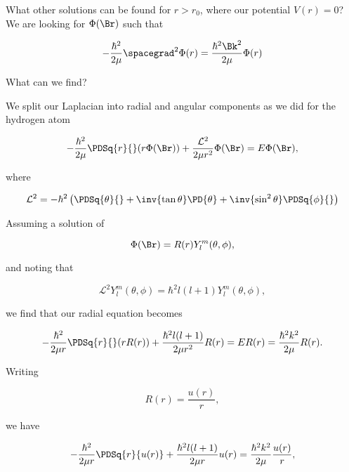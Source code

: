 What other solutions can be found for $r > r_0$, where our potential $V(r) = 0$?  We are looking for $\Phi(\Br)$ such that

\begin{equation}\label{eqn:qmTwoL23:60}
- \frac{\hbar^2}{2\mu} \spacegrad^2
\Phi(r)
 = \frac{\hbar^2 \Bk^2}{2 \mu}
\Phi(r)
\end{equation}

What can we find?

We split our Laplacian into radial and angular components as we did for the hydrogen atom

\begin{equation}\label{eqn:qmTwoL23:80}
- \frac{\hbar^2}{2\mu} \PDSq{r}{} (r \Phi(\Br)) +
\frac{\mathcal{L}^2}{2 \mu r^2}
\Phi(\Br)
=
E \Phi(\Br),
\end{equation}

where

\begin{equation}\label{eqn:qmTwoL23:100}
\mathcal{L}^2 = -\hbar^2 \left(
\PDSq{\theta}{}
+ \inv{\tan\theta} \PD{\theta}
+ \inv{\sin^2\theta} \PDSq{\phi}{}
\right)
\end{equation}

Assuming a solution of

\begin{equation}\label{eqn:qmTwoL23:120}
\Phi(\Br) = R(r) Y_l^m(\theta, \phi),
\end{equation}

and noting that

\begin{equation}\label{eqn:qmTwoL23:140}
\mathcal{L}^2 Y_l^m(\theta, \phi) = \hbar^2 l (l+1) Y_l^m(\theta, \phi),
\end{equation}

we find that our radial equation becomes

\begin{equation}\label{eqn:qmTwoL23:160}
- \frac{\hbar^2}{2 \mu r} \PDSq{r}{} (r R(r))
+\frac{\hbar^2 l (l+1)
}{2 \mu r^2}
R(r)
=
E R(r)
=
\frac{\hbar^2 k^2}{2\mu} R(r).
\end{equation}

Writing

\begin{equation}\label{eqn:qmTwoL23:180}
R(r) = \frac{u(r)}{r},
\end{equation}

we have

\begin{equation}\label{eqn:qmTwoL23:200}
- \frac{\hbar^2}{2 \mu r} \PDSq{r}{u(r)}
+\frac{\hbar^2 l (l+1)
}{2 \mu r}
u(r)
=
\frac{\hbar^2 k^2}{2\mu}
 \frac{u(r)}{r},
\end{equation}

